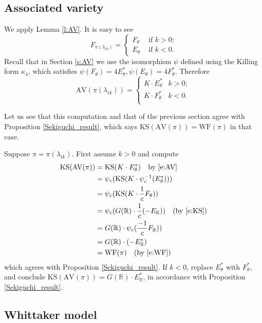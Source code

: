 \documentclass[cupthm]{CUP-JNL-JMJ}
\numberwithin{equation}{section}
\theoremstyle{cupplain}
\theoremstyle{cupdefinition}
\theoremstyle{cupremark}
\theoremstyle{cupproof}
\newcommand{\R}{\mathbb R}
\newcommand\inv{^{-1}}
\newcommand{\AV}{\mathrm{AV}}
\newcommand{\KS}{\mathrm{KS}}
\newcommand{\WF}{\mathrm{WF}}
\begin{document}
\subsection{Associated variety}

We apply Lemma \ref{l:AV}. It is easy to see
$$
F_{\pi(\lambda_{ik})}=
\begin{cases} F_\theta&\text{ if $k>0$;}\\
  E_\theta& \text{ if $k<0$.}
\end{cases}
$$
Recall that in Section \ref{s:AV} we use the isomorphism $\psi$ defined using the Killing form $\kappa_4$, which satisfies
$\psi(F_\theta)=4E^*_\theta, \psi(E_\theta)=4F^*_\theta$. 
Therefore
\begin{equation}
  \label{e:AV}
\AV(\pi(\lambda_{ik}))=
\begin{cases}K\cdot E_\theta^*&k>0;\\
  K\cdot F_\theta^*&k<0.\\
\end{cases}
\end{equation}

Let us see that this computation and that of the previous section agree with Proposition \ref{Sekiguchi_result}, which says $\KS(\AV(\pi))=\WF(\pi)$ in that case.

Suppose $\pi=\pi(\lambda_{ik})$. First assume $k>0$ and compute
$$
\begin{aligned}
\KS(\AV(\pi))&=  \KS(K\cdot E_\theta^*)\quad \text{by \eqref{e:AV}}\\
&=  \psi_c(\KS(K\cdot \psi_c\inv (E_\theta^*)))\\
  &=  \psi_c(\KS(K\cdot \frac 1c F_\theta))\\
&=\psi_c(G(\R)\cdot \frac 1c(-E_\R))\quad\text{(by \eqref{e:KS})}\\
&=  G(\R)\cdot \psi_c(\frac{-1}c F_\R))\\
&=G(\R)\cdot (-E_\R^*)\\
&=\WF(\pi)\quad \text{(by \eqref{e:WF})}
\end{aligned}
$$
which agrees with 
Proposition \ref{Sekiguchi_result}. If $k<0$, replace $E_\theta^*$ with $F_\theta^*$, and conclude $\KS(\AV(\pi))=G(\R)\cdot E_\R^*$, in accordance with
Proposition \ref{Sekiguchi_result}.

\subsection{Whittaker model}
\end{document}
